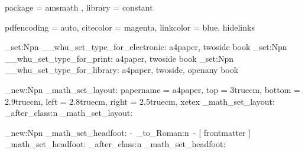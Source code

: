 \WHUDependency 
  {
    package = { amsmath },
    library = { constant }
  }


\AtEndPreamble
  {
    \RequirePackage { hyperref }
    \hypersetup 
      { 
        pdfencoding = auto,
        citecolor   = magenta,
        linkcolor   = blue,
        hidelinks
      }
  }



\cs_set:Npn \__whu_set_type_for_electronic:
  {
    \PassOptionsToClass 
      { a4paper, twoside } { book }
  }
\cs_set:Npn \__whu_set_type_for_print:
  {
    \PassOptionsToClass 
      { a4paper, twoside } { book }
    \AtEndPreamble { \hypersetup { allcolors = black } }
  }
\cs_set:Npn \__whu_set_type_for_library:
  {
    \PassOptionsToClass 
      { a4paper, twoside, openany } { book }
    \AtEndPreamble { \hypersetup { allcolors = black } }
  }



\cs_new:Npn \whu_math_set_layout:
  {
    \setuplayout
      {
        papername = a4paper,
        top       = 3truecm,
        bottom    = 2.9truecm,
        left      = 2.8truecm,
        right     = 2.5truecm,
        xetex
      }
  }
  { \whu_math_set_layout: }
  { \whu_after_class:n { \whu_math_set_layout: } }



\cs_new:Npn \whu_math_set_headfoot:
  {
      {
        \setheadrulewidth { 0.5pt }
        \setfootrulewidth { 0pt }
        \sethead [LR] {}
        \setcenterfoot 
          { 
            -\,
            \int_to_Roman:n { \c@page }  %
            \,- 
          }
      }
     [ frontmatter ]
      {
      }
      {
      }
      {
      }
  }
  { \whu_math_set_headfoot: }
  { \whu_after_class:n { \whu_math_set_headfoot: } }



